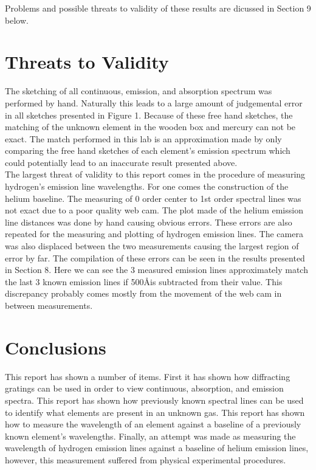 \documentclass{article}
\begin{document}
Problems and possible threats to validity of these results are dicussed in Section
9 below.



\section{Threats to Validity}

The sketching of all continuous, emission, and absorption spectrum was performed by hand.
Naturally this leads to a large amount of judgemental error in all sketches 
presented in Figure 1. Because of these free hand sketches, the matching of the unknown
element in the wooden box and mercury can not be exact. The match performed in this 
lab is an approximation made by only comparing the free hand sketches of each 
element's emission spectrum which could potentially lead to an inaccurate result
presented above.\\

The largest threat of validity to this report comes in the procedure of measuring
hydrogen's emission line wavelengths. For one comes the construction of the helium
baseline. The measuring of 0 order center to 1st order spectral lines was not exact
due to a poor quality web cam. The plot made of the helium emission line distances
was done by hand causing obvious errors. These errors are also repeated for the measuring
and plotting of hydrogen emission lines. The camera was also displaced between the two
measurements causing the largest region of error by far. The compilation of these errors
can be seen in the results presented in Section 8. Here we can see the 3 measured 
emission lines approximately match the last 3 known emission lines if 500\AA is 
subtracted from their value. This discrepancy probably comes mostly from the movement
of the web cam in between measurements.



\section{Conclusions}

This report has shown a number of items. First it has shown how diffracting gratings
can be used in order to view continuous, absorption, and emission spectra. This
report has shown how previously known spectral lines can be used to identify what
elements are present in an unknown gas. This report has shown how to measure
the wavelength of an element against a baseline of a previously known element's
wavelengths. Finally, an attempt was made as measuring the wavelength of hydrogen
emission lines against a baseline of helium emission lines, however, this measurement
suffered from physical experimental procedures.\\
\end{document}
